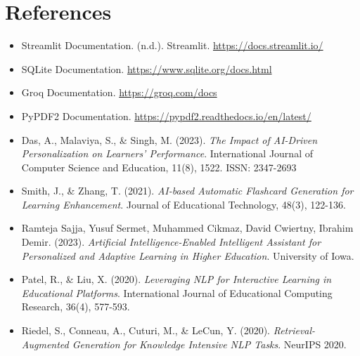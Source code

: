 \documentclass{report}
\begin{document}
\chapter{References}
\begin{itemize}
    \item Streamlit Documentation. (n.d.). Streamlit. \url{https://docs.streamlit.io/}
    \item SQLite Documentation. \url{https://www.sqlite.org/docs.html}
    \item Groq Documentation. \url{https://groq.com/docs}
    \item PyPDF2 Documentation. \url{https://pypdf2.readthedocs.io/en/latest/}
    \item Das, A., Malaviya, S., \& Singh, M. (2023). \textit{The Impact of AI-Driven Personalization on Learners' Performance}. International Journal of Computer Science and Education, 11(8), 1522. ISSN: 2347-2693
    \item Smith, J., \& Zhang, T. (2021). \textit{AI-based Automatic Flashcard Generation for Learning Enhancement}. Journal of Educational Technology, 48(3), 122-136.
    \item Ramteja Sajja, Yusuf Sermet, Muhammed Cikmaz, David Cwiertny, Ibrahim Demir. (2023). \textit{Artificial Intelligence-Enabled Intelligent Assistant for Personalized and Adaptive Learning in Higher Education}. University of Iowa.
    \item Patel, R., \& Liu, X. (2020). \textit{Leveraging NLP for Interactive Learning in Educational Platforms}. International Journal of Educational Computing Research, 36(4), 577-593.
    \item Riedel, S., Conneau, A., Cuturi, M., \& LeCun, Y. (2020). \textit{Retrieval-Augmented Generation for Knowledge Intensive NLP Tasks}. NeurIPS 2020.
\end{itemize}
\end{document}
